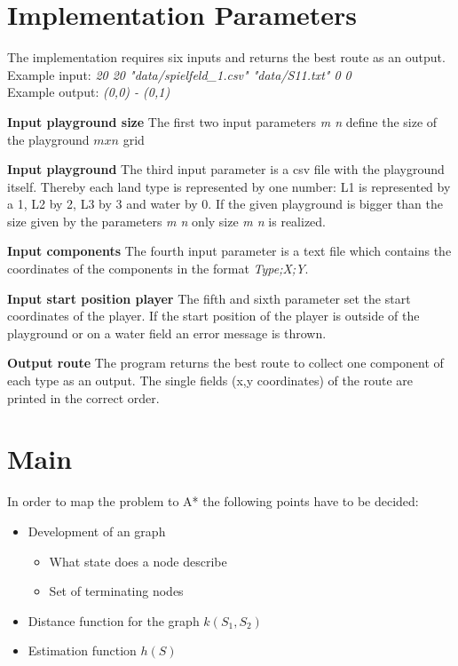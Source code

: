\documentclass{article}
\begin{document}
\section{Implementation Parameters}
The implementation requires six inputs and returns the best route as an output.\\
Example input: \textit{20 20 "data/spielfeld\_1.csv" "data/S11.txt" 0 0}\\
Example output: \textit{(0,0) - (0,1)}
\begin{description}
    \item{\textbf{Input playground size}} The first two input parameters \textit{m n} define the size of the playground $m x n$ grid
    \item{\textbf{Input playground}} The third input parameter is a csv file with the playground itself. Thereby each land type is represented by one number: L1 is represented by a 1, L2 by 2, L3 by 3 and water by 0. If the given playground is bigger than the size given by the parameters \textit{m n} only size \textit{m n} is realized.
    \item{\textbf{Input components}} The fourth input parameter is a text file which contains the coordinates of the components in the format \textit{Type;X;Y}.
    \item{\textbf{Input start position player}} The fifth and sixth parameter set the start coordinates of the player. If the start position of the player is outside of the playground or on a water field an error message is thrown.
    \item{\textbf{Output route}} The program returns the best route to collect one component of each type as an output. The single fields (x,y coordinates) of the route are printed in the correct order.
\end{description}

\section{Main}
In order to map the problem to A* the following points have to be decided:
\begin{itemize}
    \item Development of an graph
        \begin{itemize}
            \item What state does a node describe
            \item Set of terminating nodes
        \end{itemize}
    \item Distance function for the graph $k(S_1, S_2)$
    \item Estimation function $h(S)$
\end{itemize}
\end{document}
